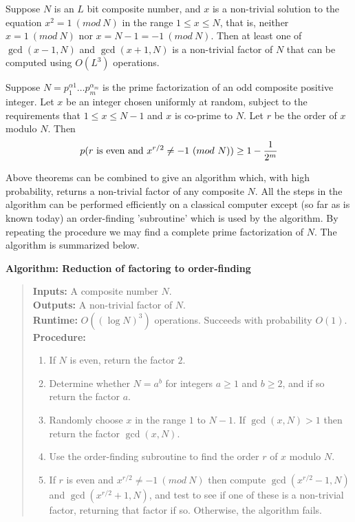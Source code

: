 \begin{theorem}
    Suppose $N$ is an $L$ bit composite number, and $x$ is a non-trivial solution to the equation $x^2 = 1\ (mod\ N)$ in the range $1 \le x \le N$, that is, neither $x = 1\ (mod\ N)$ nor $x = N - 1 = -1\ (mod\ N)$. Then at least one of $\gcd(x - 1,N)$ and $\gcd(x + 1,N)$ is a non-trivial factor of $N$ that can be computed using $O(L^3)$ operations.
\end{theorem}
\begin{theorem}
    Suppose $N = p_1^{\alpha 1}\dots p_m^{\alpha_m}$ is the prime factorization of an odd composite positive integer. Let $x$ be an integer chosen uniformly at random, subject to the requirements that $1 \le x \le N - 1$ and $x$ is co-prime to $N$. Let $r$ be the order of $x$ modulo $N$. Then
    $$p(r\textnormal{ is even and }x^{r/2} \neq -1\ (mod\ N)) \geq 1 - \frac{1}{2^m}$$
\end{theorem}

Above theorems can be combined to give an algorithm which, with high probability, returns a non-trivial factor of any composite $N$. All the steps in the algorithm can be performed efficiently on a classical computer except (so far as is known today) an order-finding 'subroutine' which is used by the algorithm. By repeating the procedure we may find a complete prime factorization of $N$. The algorithm is summarized below.
\vspace{1em}

\textbf{Algorithm: Reduction of factoring to order-finding}
\begin{quote}
    \textbf{Inputs:} A composite number $N$.\\
    \textbf{Outputs:} A non-trivial factor of $N$.\\
    \textbf{Runtime:} $O((\log N)^3)$ operations. Succeeds with probability $O(1)$.\\
    \textbf{Procedure:}
    \begin{enumerate}
        \item If $N$ is even, return the factor $2$.
        \item Determine whether $N = a^b$ for integers $a \geq 1$ and $b \geq 2$, and if so return the factor $a$.
        \item Randomly choose $x$ in the range $1$ to $N-1$. If $\gcd(x,N) > 1$ then return the factor $\gcd(x,N)$.
        \item Use the order-finding subroutine to find the order $r$ of $x$ modulo $N$.
        \item If $r$ is even and $x^{r/2} \neq -1\ (mod\ N)$ then compute $\gcd(x^{r/2}-1,N)$ and $\gcd(x^{r/2} + 1, N)$, and test to see if one of these is a non-trivial factor, returning that factor if so. Otherwise, the algorithm fails.
    \end{enumerate}
\end{quote}


